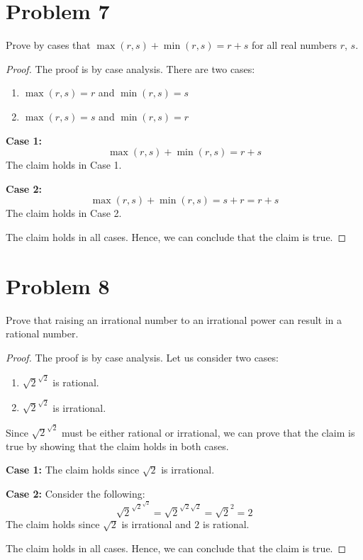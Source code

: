 \documentclass{article}
\begin{document}
\pagebreak

\section{Problem 7}
Prove by cases that $\max(r,s) + \min(r,s) = r + s$ for all real numbers $r$, $s$.
\begin{proof}
	The proof is by case analysis. There are two cases:
	\begin{enumerate}
		\item $\max(r,s) = r$ and $\min(r,s) = s$
		\item $\max(r,s) = s$ and $\min(r,s) = r$
	\end{enumerate}

	\textbf{Case 1:}
	\[
		\max(r,s) + \min(r,s) = r + s
	\]
	The claim holds in Case 1.

	\textbf{Case 2:}
	\[
		\max(r,s) + \min(r,s) = s + r = r + s
	\]
	The claim holds in Case 2.

	The claim holds in all cases. Hence, we can conclude that the claim is true.
\end{proof}

\pagebreak
\section{Problem 8}
Prove that raising an irrational number to an irrational power can result in a rational number.
\begin{proof}
	The proof is by case analysis. Let us consider two cases:
	\begin{enumerate}
		\item $\sqrt{2}^{\sqrt{2}}$ is rational.
		\item $\sqrt{2}^{\sqrt{2}}$ is irrational.
	\end{enumerate}
	Since $\sqrt{2}^{\sqrt{2}}$ must be either rational or irrational, we can prove that the claim is true by showing that the claim holds in both cases.

	\textbf{Case 1:}
	The claim holds since $\sqrt{2}$ is irrational.

	\textbf{Case 2:}
	Consider the following:
	\[
		\sqrt{2}^{{\sqrt{2}}^{\sqrt{2}}} = \sqrt{2}^{\sqrt{2}\sqrt{2}} = \sqrt{2}^2 = 2
	\]
	The claim holds since $\sqrt{2}$ is irrational and $2$ is rational.

	The claim holds in all cases. Hence, we can conclude that the claim is true.
\end{proof}
\pagebreak
\end{document}
